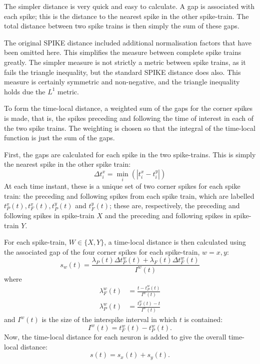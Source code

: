 The simpler distance is very quick and easy to calculate.  A gap is associated with each spike; this is the distance to the nearest spike in the other spike-train.  The total distance between two spike trains is then simply the sum of these gaps.  

The original SPIKE distance included additional normalisation factors that have been omitted here. This simplifies the measure between complete spike trains greatly. The simpler measure is not strictly a metric between spike trains, as it fails the triangle inequality, but the standard SPIKE distance does also. This measure is certainly symmetric and non-negative, and the triangle inequality holds due the $L^1$ metric.

To form the time-local distance, a weighted sum of the gaps for the corner spikes is made, that is, the spikes preceding and following the time of interest in each of the two spike trains.  The weighting is chosen so that the integral of the time-local function is just the sum of the gaps.

First, the gaps are calculated for each spike in the two spike-trains.  This is simply the nearest spike in the other spike train:
\begin{equation}
\Delta t_i^x = \min_i ( | t_i^x - t_i^y |)
\end{equation}
At each time instant, these is a unique set of two corner spikes for each spike train: the preceding and following spikes from each spike train, which are labelled $t_P^x(t), t_F^x(t), t_P^y(t)$ and  $t_F^y(t)$; these are, respectively, the preceding and following spikes in spike-train $X$ and the preceding and following spikes in spike-train $Y$.

For each spike-train, $W\in \{ X, Y \}$, a time-local distance is then calculated using the associated gap of the four corner spikes for each spike-train, $w=x,y$:
\begin{equation}
s_w(t) = \frac{\lambda_P(t) \Delta t_P^w(t) + \lambda_F(t)\Delta t_F^w(t)}{I^w(t)}
\end{equation}
where
\begin{equation}
\begin{split}
\lambda_F^w(t) &= \frac{t- t_P^w(t)}{I^w(t)}\\ \lambda_P^w(t) &= \frac{ t_F^w(t) - t}{I^w(t)}
\end{split}
\end{equation}
and $I^w(t)$ is the size of the interspike interval in which $t$ is contained:
\begin{equation}
I^w(t) = t_F^w(t) - t_P^w(t).
\end{equation}
Now, the time-local distance for each neuron is added to give the overall time-local distance:
\begin{equation}
s(t) = s_x(t) + s_y(t).
\end{equation}

